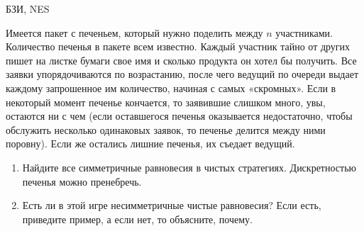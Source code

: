 \begin{problem}
\begin{source}
БЗИ, NES
\end{source} Имеется пакет с печеньем,
который нужно поделить между $n$ участниками. Количество
печенья в пакете всем известно. Каждый участник тайно от
других пишет на листке бумаги свое имя и сколько продукта
он хотел бы получить. Все заявки упорядочиваются по
возрастанию, после чего ведущий по очереди выдает каждому
запрошенное им количество, начиная с самых «скромных».
Если в некоторый момент печенье кончается, то заявившие
слишком много, увы, остаются ни с чем (если оставшегося
печенья оказывается недостаточно, чтобы обслужить несколько
одинаковых заявок, то печенье делится между ними поровну). Если же
остались лишние печенья, их съедает ведущий.

\begin{enumerate}

\item Найдите все симметричные равновесия в чистых
стратегиях. Дискретностью печенья можно пренебречь.

\item Есть ли в этой игре несимметричные чистые равновесия?
Если есть, приведите пример, а если нет, то объясните,
почему.

\end{enumerate}







\begin{sol}

\end{sol}
\end{problem}
















